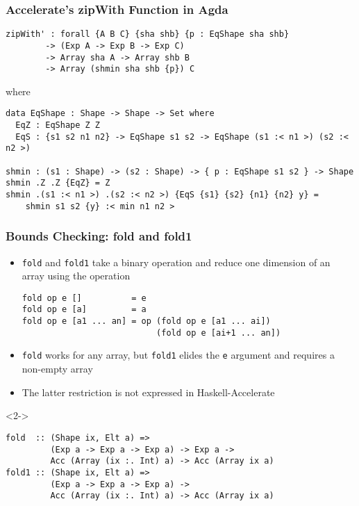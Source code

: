 \documentclass{beamer}
\begin{document}
\begin{frame}[fragile]
  \frametitle{Accelerate's zipWith Function in Agda}
\begin{verbatim}
zipWith' : forall {A B C} {sha shb} {p : EqShape sha shb}
        -> (Exp A -> Exp B -> Exp C)
        -> Array sha A -> Array shb B
        -> Array (shmin sha shb {p}) C
\end{verbatim}
where\scriptsize
\begin{verbatim}
data EqShape : Shape -> Shape -> Set where
  EqZ : EqShape Z Z
  EqS : {s1 s2 n1 n2} -> EqShape s1 s2 -> EqShape (s1 :< n1 >) (s2 :< n2 >)

shmin : (s1 : Shape) -> (s2 : Shape) -> { p : EqShape s1 s2 } -> Shape
shmin .Z .Z {EqZ} = Z
shmin .(s1 :< n1 >) .(s2 :< n2 >) {EqS {s1} {s2} {n1} {n2} y} =
    shmin s1 s2 {y} :< min n1 n2 >
\end{verbatim}
\end{frame}

\begin{frame}[fragile]
  \frametitle{Bounds Checking: fold and fold1}
  \vspace{-\baselineskip}
  \begin{itemize}
  \item \texttt{fold} and \texttt{fold1} take a binary operation and
    reduce one dimension of an array using the operation
\begin{verbatim}
fold op e []          = e
fold op e [a]         = a
fold op e [a1 ... an] = op (fold op e [a1 ... ai])
                           (fold op e [ai+1 ... an])
\end{verbatim}
  \item \texttt{fold} works for any array, but \texttt{fold1} elides
    the \texttt{e} argument and requires a non-empty array
  \item The latter restriction is not expressed in Haskell-Accelerate
  \end{itemize}
  \begin{block}<2->{\vspace{-\baselineskip}}
\vspace{-\baselineskip}\small
\begin{verbatim}
fold  :: (Shape ix, Elt a) =>
         (Exp a -> Exp a -> Exp a) -> Exp a ->
         Acc (Array (ix :. Int) a) -> Acc (Array ix a)
fold1 :: (Shape ix, Elt a) =>
         (Exp a -> Exp a -> Exp a) ->
         Acc (Array (ix :. Int) a) -> Acc (Array ix a)
\end{verbatim}
\vspace{-\baselineskip}
  \end{block}
\end{frame}
\end{document}
